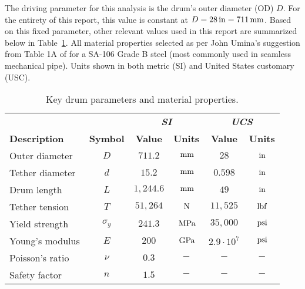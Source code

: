 \label{chapt:standards}

The driving parameter for this analysis is the drum's outer diameter (OD) $D$. For the entirety of this report, this value is constant at $D = 28\,\mathrm{in} = 711\,\mathrm{mm}$. Based on this fixed parameter, other relevant values used in this report are summarized below in Table~\ref{table:prelim_params}. All material properties selected as per John Umina's  suggestion from Table 1A of \cite{ASMEbvpcIID} for a SA-106 Grade B steel (most commonly used in seamless mechanical pipe). Units shown in both metric (SI) and United States customary (USC).\\

\begin{table}[ht]
	\caption{Key drum parameters and material properties.}
	\centering
	\begin{tabular}{lccccc}
		&       & \multicolumn{2}{c}{\textbf{\textit{SI}}} & \multicolumn{2}{c}{\textbf{\textit{UCS}}} \\
		\textbf{Description} & \textbf{Symbol} & \textbf{Value} & \textbf{Units} & \textbf{Value}  & \textbf{Units} \\
		\midrule
		Outer diameter       & $D$           & $711.2$        & $\,\mathrm{mm}$           & $28$            & $\,\mathrm{in}$           \\
		Tether diameter      & $d$       	   & $15.2$         & $\,\mathrm{mm}$           & $0.598$         & $\,\mathrm{in}$           \\
		Drum length          & $L$             & $1,244.6$      & $\,\mathrm{mm}$           & $49$            & $\,\mathrm{in}$           \\
		Tether tension       & $T$             & $51,264$       & $\,\mathrm{N}$            & $11,525$        & $\,\mathrm{lbf}$          \\
		Yield strength       & $\sigma_y$           & $241.3$        & $\,\mathrm{MPa}$          & $35,000$        & $\,\mathrm{psi}$          \\
		Young's modulus      & $E$             & $200$          & $\,\mathrm{GPa}$          & $2.9\cdot 10^7$ & $\,\mathrm{psi}$          \\
		Poisson's ratio      & $\nu$           & $0.3$          & $-$            		& $-$             & $-$           		  \\
		Safety factor        & $n$            & $1.5$          & $-$            		& $-$             & $-$            	      \\
	\end{tabular}%
	\label{table:prelim_params}
\end{table}

